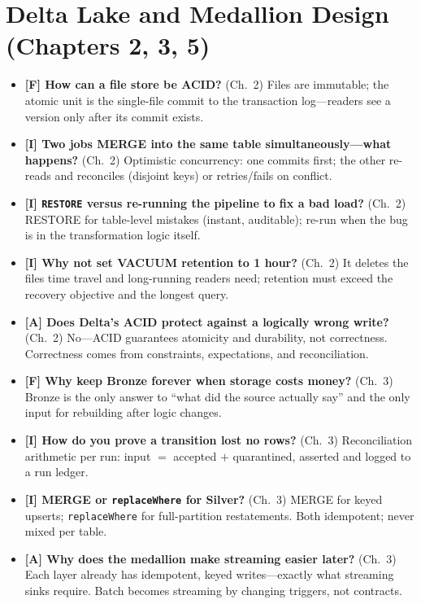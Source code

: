 \section{Delta Lake and Medallion Design (Chapters 2, 3, 5)}
%
\begin{itemize}
    \item \textbf{[F] How can a file store be ACID?} (Ch.~2) Files are immutable; the atomic
    unit is the single-file commit to the transaction log---readers see a version only after
    its commit exists.
    \item \textbf{[I] Two jobs MERGE into the same table simultaneously---what happens?}
    (Ch.~2) Optimistic concurrency: one commits first; the other re-reads and reconciles
    (disjoint keys) or retries/fails on conflict.
    \item \textbf{[I] \texttt{RESTORE} versus re-running the pipeline to fix a bad load?}
    (Ch.~2) RESTORE for table-level mistakes (instant, auditable); re-run when the bug is in
    the transformation logic itself.
    \item \textbf{[I] Why not set VACUUM retention to 1 hour?} (Ch.~2) It deletes the files
    time travel and long-running readers need; retention must exceed the recovery objective
    and the longest query.
    \item \textbf{[A] Does Delta's ACID protect against a logically wrong write?} (Ch.~2)
    No---ACID guarantees atomicity and durability, not correctness. Correctness comes from
    constraints, expectations, and reconciliation.
    \item \textbf{[F] Why keep Bronze forever when storage costs money?} (Ch.~3) Bronze is the
    only answer to ``what did the source actually say'' and the only input for rebuilding
    after logic changes.
    \item \textbf{[I] How do you prove a transition lost no rows?} (Ch.~3) Reconciliation
    arithmetic per run: input $=$ accepted $+$ quarantined, asserted and logged to a run
    ledger.
    \item \textbf{[I] MERGE or \texttt{replaceWhere} for Silver?} (Ch.~3) MERGE for keyed
    upserts; \texttt{replaceWhere} for full-partition restatements. Both idempotent; never
    mixed per table.
    \item \textbf{[A] Why does the medallion make streaming easier later?} (Ch.~3) Each layer
    already has idempotent, keyed writes---exactly what streaming sinks require. Batch becomes
    streaming by changing triggers, not contracts.

\end{itemize}
